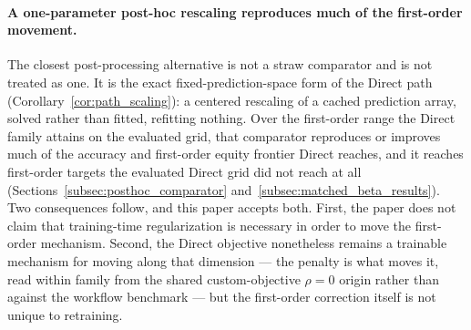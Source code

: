 \documentclass[10pt]{article}
\theoremstyle{definition}
\newcommand{\1}{\mathbf{1}}
\begin{document}
\paragraph{A one-parameter post-hoc rescaling reproduces much of the first-order
movement.}
The closest post-processing alternative is not a straw comparator and is not treated as
one. It is the exact fixed-prediction-space form of the Direct path
(Corollary~\ref{cor:path_scaling}): a centered rescaling of a cached prediction array, solved rather
than fitted, refitting nothing. Over the first-order range the Direct family attains on the
evaluated grid, that comparator reproduces or improves much of the accuracy and first-order equity
frontier Direct reaches, and it reaches first-order targets the evaluated Direct grid did not reach
at all (Sections~\ref{subsec:posthoc_comparator} and~\ref{subsec:matched_beta_results}). Two
consequences follow, and this paper accepts both. First, the paper does not claim that training-time
regularization is necessary in order to move the first-order mechanism. Second, the Direct objective
nonetheless remains a trainable mechanism for moving along that dimension --- the penalty is what
moves it, read within family from the shared custom-objective $\rho=0$ origin rather than against
the workflow benchmark --- but the first-order correction itself is not unique to retraining.
\end{document}
